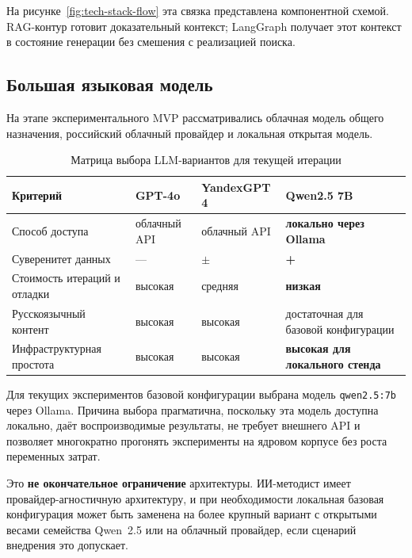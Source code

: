 На рисунке~\ref{fig:tech-stack-flow} эта связка представлена компонентной
схемой. RAG-контур готовит доказательный контекст; LangGraph получает
этот контекст в состояние генерации без смешения с реализацией поиска.



\subsection{Большая языковая модель}

На этапе экспериментального MVP рассматривались облачная модель общего назначения,
российский облачный провайдер и локальная открытая модель.

\begin{table}[H]
  \caption{Матрица выбора LLM-вариантов для текущей итерации}
  \label{tab:llms}
  \centering
  \begin{tabular}{|P{4cm}|P{3.2cm}|P{3.2cm}|P{3.2cm}|}
  \hline
  \textbf{Критерий}
    & \textbf{GPT-4o}
    & \textbf{YandexGPT 4}
    & \textbf{Qwen2.5 7B} \\
  \hline
  Способ доступа
    & облачный API
    & облачный API
    & \textbf{локально через Ollama} \\
  \hline
  Суверенитет данных
    & —
    & $\pm$
    & \textbf{+} \\
  \hline
  Стоимость итераций и отладки
    & высокая
    & средняя
    & \textbf{низкая} \\
  \hline
  Русскоязычный контент
    & высокая
    & высокая
    & достаточная для базовой конфигурации \\
  \hline
  Инфраструктурная простота
    & высокая
    & высокая
    & \textbf{высокая для локального стенда} \\
  \hline
  \end{tabular}
\end{table}

Для текущих экспериментов базовой конфигурации выбрана модель
\texttt{qwen2.5:7b} через Ollama. Причина выбора прагматична, поскольку
эта модель доступна локально, даёт воспроизводимые результаты,
не требует внешнего API и позволяет многократно прогонять
эксперименты на ядровом корпусе без роста переменных затрат.

Это \textbf{не окончательное ограничение} архитектуры. ИИ-методист имеет
провайдер-агностичную архитектуру, и при необходимости локальная базовая конфигурация может быть заменена
на более крупный вариант с открытыми весами семейства Qwen~2.5 или
на облачный провайдер, если сценарий внедрения это допускает.

